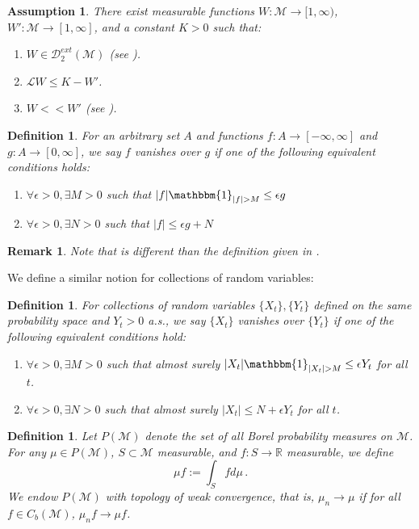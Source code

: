 \documentclass[final]{amsart}
\newtheorem{ass}{Assumption}[]
\newtheorem{deff}[thm]{Definition}
\newtheorem{rem}[thm]{Remark}
\numberwithin{thm}{section}
\numberwithin{equation}{section}
\newcommand{\mcM}{\mathcal{M}}
\newcommand{\Id}{\mathbbm{1}}
\newcommand{\Dme}{\mathcal{D}^{ext}}
\begin{document}
\begin{ass}
        \label{as-W} There exist measurable functions $W: \mcM \to [1,\infty)$, $W': \mcM \to [1,\infty]$, and a constant $K > 0$ such that: \begin{enumerate}
            \item  $W \in \Dme_2(\mcM)$ (see ).
            \item $\mathcal{L}W \leq K - W'$.
            \item $W << W'$ (see \Cref{<<}).
        \end{enumerate}
\end{ass}

    
\begin{deff}\label{fxn-vanish}
    For an arbitrary set $A$ and functions $f: A \to [-\infty,\infty]$ and $g:A \to [0,\infty]$, we say $f$ vanishes over $g$ if one of the following equivalent conditions holds: \begin{enumerate}
    
        \item $\forall \epsilon > 0, \exists M > 0$ such that $|f|\Id_{|f|>M} \leq \epsilon g$
        \item $\forall \epsilon > 0, \exists N > 0$ such that $|f| \leq \epsilon g + N$
    \end{enumerate}
\end{deff}
\begin{rem}
    Note that  is different than the definition given in \cite[Definition 2.18]{extinction}.
\end{rem}

We define a similar notion for collections of random variables:
\begin{deff}\label{rv-vanish}
    For collections of random variables $\{X_t\},\{Y_t\}$ defined on the same probability space and $Y_t > 0$ a.s., we say $\{X_t\}$ vanishes over $\{Y_t\}$ if one of the following equivalent conditions hold:
    \begin{enumerate}
        \item $\forall \epsilon > 0, \exists M > 0$ such that almost surely $|X_t|\Id_{|X_t|>M} \leq \epsilon Y_t$ for all $t$.
        \item $\forall \epsilon > 0, \exists N > 0$ such that almost surely $|X_t| \leq N + \epsilon Y_t$ for all $t$.
    \end{enumerate}
    
\end{deff}

\begin{deff}
\label{meas}
    Let $P(\mcM)$ denote the set of all Borel probability measures on $\mcM$. 
    For any $\mu \in P(\mcM)$, $S \subset \mcM$ measurable, and $f:S \to \mathbb{R}$ measurable, we define
$$
\mu f := \int_S f d\mu \,.
$$
    We endow $P(\mcM)$ with topology of weak convergence, that is, $\mu_n \to \mu$ if for all $f \in C_b(\mcM)$, $\mu_nf \to \mu f$. 
\end{deff}
\end{document}
